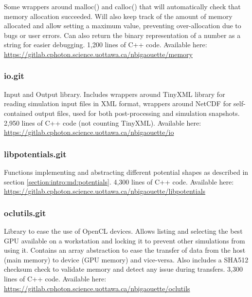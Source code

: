 Some wrappers around malloc() and calloc() that will automatically check that
memory allocation succeeded. Will also keep track of the amount of
memory allocated and allow setting a maximum value, preventing
over-allocation due to bugs or user errors. Can also return the binary
representation of a number as a string for easier debugging. 1,200 lines of
C++ code. Available here:\\
\url{https://gitlab.cphoton.science.uottawa.ca/nbigaouette/memory}


\subsubsection{io.git} \label{section:tools:libraries:io}

Input and Output library. Includes wrappers around TinyXML library\cite{tinyxml}
for reading simulation input files in XML format,
wrappers around NetCDF\cite{netcdf} for self-contained
output files, used for both post-processing and simulation snapshots.
2,950 lines of C++ code (not counting TinyXML). Available here:\\
\url{https://gitlab.cphoton.science.uottawa.ca/nbigaouette/io}


\subsubsection{libpotentials.git} \label{section:tools:libraries:libpotentials}

Functions implementing and abstracting different potential shapes as
described in section \ref{section:intro:md:potentials}. 4,300 lines of C++ code.
Available here:\\
\url{https://gitlab.cphoton.science.uottawa.ca/nbigaouette/libpotentials}


\subsubsection{oclutils.git} \label{section:tools:libraries:oclutils}

Library to ease the use of OpenCL devices. Allows listing and selecting the
best GPU available on a workstation and locking it to prevent
other simulations from using it. Contains an array abstraction to ease the
transfer of data from the host (main memory) to device (GPU memory) and
vice-versa. Also includes a SHA512 checksum check to validate memory
and detect any issue during transfers. 3,300 lines of C++ code.
Available here:
\url{https://gitlab.cphoton.science.uottawa.ca/nbigaouette/oclutils}


